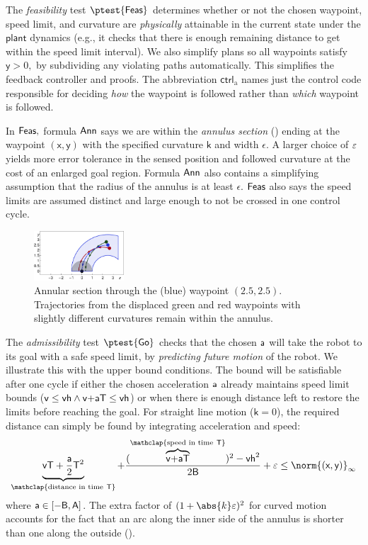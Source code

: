 \documentclass[12pt]{cmuthesis}
\theoremstyle{definition}
\theoremstyle{remark}
\newcommand{\xgvar}{\textsf{x}}
\newcommand{\ygvar}{\textsf{y}}
\newcommand{\kvar}{\textsf{k}}
\newcommand{\vhvar}{\textsf{vh}}
\newcommand{\Tvar}{{\sf T}\xspace}
\newcommand{\Avar}{{\sf A}\xspace}
\newcommand{\Bvar}{{\sf B}\xspace}
\newcommand{\vvar}{{\sf v}\xspace}
\newcommand{\avar}{{\sf a}\xspace}
\newcommand{\ctrl}{\textsf{ctrl}\xspace}
\newcommand{\ctrlliv}{\ctrl_{\text{a}}}
\newcommand{\plant}{\textsf{plant}\xspace}
\newcommand{\lnorm}[1]{{{\norm{#1}}_{\infty}}}
\newcommand{\rref}[2][]{\prettyref{#2}}
\begin{document}
The \emph{feasibility} test $\ptest{\planreq}$ determines whether or not the chosen waypoint, speed limit, and curvature are \emph{physically} attainable in the current state under the $\plant$ dynamics (e.g., it checks that there is enough remaining distance to get within the speed limit interval).
We also simplify plans so all waypoints satisfy $\ygvar > 0,$ by subdividing any violating paths automatically.
This simplifies the feedback controller and proofs.
The abbreviation $\ctrlliv$ names just the control code responsible for deciding \emph{how} the waypoint is followed rather than \emph{which} waypoint is followed.


In $\textsf{Feas},$ formula $\textsf{Ann}$ says we are within the \emph{annulus section} (\rref{fig:circlestaging}) ending at the waypoint $(\xgvar, \ygvar)$ with the specified curvature $\kvar$ and width $\epsilon$.
A larger choice of $\varepsilon$ yields more error tolerance in the sensed position and followed curvature at the cost of an enlarged goal region.
Formula $\textsf{Ann}$ also contains a simplifying assumption that the radius of the annulus is at least $\epsilon$.
$\textsf{Feas}$ also says the speed limits are assumed distinct and large enough to not be crossed in one control cycle.

\begin{figure}[h!]
\centering
\includegraphics[width=0.3\textwidth]{graphics/fig-ode3.pdf}
\caption{Annular section through the (blue) waypoint $(2.5,2.5)$. Trajectories from the displaced green and red waypoints with slightly different curvatures remain within the annulus.}\label{fig:circlestaging}
\label{fig:circlestaging}
\end{figure}

The \emph{admissibility} test $\ptest{\admiss}$ checks that the chosen $\avar$ will take the robot to its goal with a safe speed limit, by \emph{predicting future motion} of the robot.
We illustrate this with the upper bound conditions.
The bound will be satisfiable after one cycle if either the chosen acceleration $\avar$ already maintains speed limit bounds ($\vvar \leq \vhvar \land \vvar{+}\avar\Tvar \leq \vhvar$) or when there is enough distance left to restore the limits before reaching the goal.
For straight line motion ($\kvar=0$), the required distance can simply be found by integrating acceleration and speed:
\begin{equation*}
\underbrace{\vvar\Tvar+\frac{\avar}{2}\Tvar^2}_{\mathclap{\text{distance in time}~\Tvar}} + \frac{(\overbrace{\vvar{+}\avar\Tvar}^{\mathclap{\text{speed in time}~\Tvar}})^2-\vhvar^2}{2\Bvar} + \veps \leq \lnorm{(\xgvar,\ygvar)}
\end{equation*}
where $\avar \in [-\Bvar,\Avar]$.
The extra factor of $(1 + \abs{k}\veps)^2$ for curved motion accounts for the fact that an arc along the inner side of the annulus is shorter than one along the outside (\rref{fig:circlestaging}).
\end{document}
